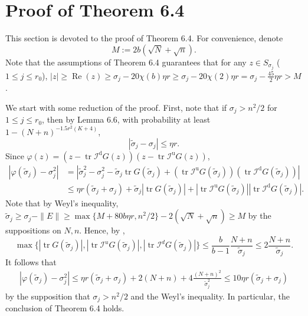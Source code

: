 \documentclass[reqno]{amsart}
\DeclareMathOperator{\tr}{tr}
\renewcommand\Re{\operatorname{Re}}
\theoremstyle{plain}
\theoremstyle{definition}
\begin{document}
\section{Proof of Theorem 6.4}\label{app:singularlocation}


This section is devoted to the proof of Theorem 6.4. 
For convenience, 
denote $$M:= 2b(\sqrt N+ \sqrt{n}).$$ 
Note that the assumptions of Theorem  6.4 guarantees that for any $z\in S_{\sigma_j}$ ($1\le j \le r_0$), $|z| \ge \Re(z) \ge \sigma_j - 20\chi(b) \eta r \ge \sigma_j - 20\chi(2) \eta r=\sigma_j - \frac{45}{2} \eta r> M$.

We start with some reduction of the proof. First, note that if $\sigma_j > n^2/2$ for $1\le j \le r_0$, then by Lemma 6.6, with probability at least $1- (N+n)^{-1.5 r^2(K+4)}$, $$|\widetilde \sigma_j - \sigma_j |\le \eta r.$$Since $\varphi(z)=(z - \tr \mathcal I^\mathrm{d} G(z))(z - \tr \mathcal I^\mathrm{u} G(z))$,
\begin{align*}
|\varphi(\widetilde \sigma_j) - \sigma_j^2| &=\left|\widetilde \sigma_j^2 - \sigma_j^2 -\widetilde \sigma_j \tr G(\widetilde \sigma_j) + (\tr \mathcal I^\mathrm{u} G(\widetilde \sigma_j))(\tr \mathcal I^\mathrm{d} G(\widetilde \sigma_j)) \right|\\
&\le \eta r(\widetilde \sigma_j  + \sigma_j) + \widetilde \sigma_j \left|\tr G(\widetilde \sigma_j) \right| + \left|\tr \mathcal I^\mathrm{u} G(\widetilde \sigma_j)\right| \left|\tr \mathcal I^\mathrm{d} G(\widetilde \sigma_j)\right|.
\end{align*}
Note that by Weyl's inequality, $\widetilde \sigma_j \ge \sigma_j - \|E\| \ge \max\{M + 80 b\eta r,n^2/2\} - 2(\sqrt N + \sqrt n) \ge M$ by the suppositions on $N,n$. Hence, by \cite[Eq. (32)]{Wang24}, 
$$\max\{|\tr G(\widetilde \sigma_j )|, |\tr \mathcal I^u G(\widetilde \sigma_j )  |, |\tr \mathcal I^d G(\widetilde \sigma_j )  |\}  \le \frac{b}{b-1}\frac{N+n}{\widetilde \sigma_j}\le 2\frac{N+n}{\widetilde \sigma_j}.$$
It follows that
\begin{align*}
|\varphi(\widetilde \sigma_j) - \sigma_j^2| \le \eta r(\widetilde \sigma_j  + \sigma_j) + 2 (N+n) + 4\frac{(N+n)^2}{\widetilde \sigma_j^2}\le 10\eta r(\widetilde \sigma_j  + \sigma_j)
\end{align*}
by the supposition that $\sigma_j > n^2/2$ and the Weyl's inequality. In particular, the conclusion of Theorem 6.4 holds. 
\end{document}
